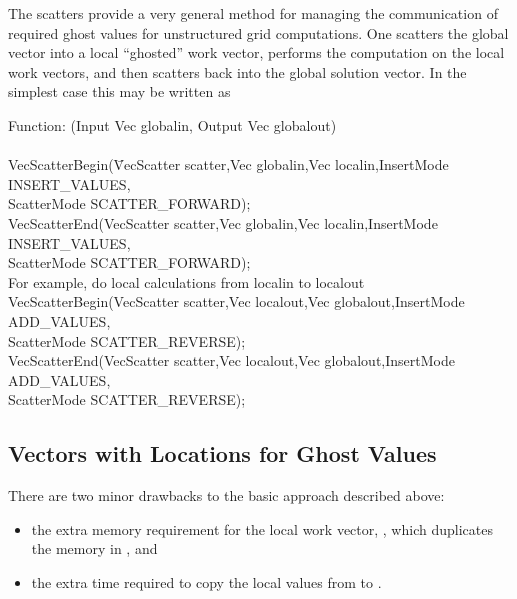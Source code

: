 The scatters provide a very general method for managing the communication of
required ghost values for unstructured grid computations. One scatters
the global vector into a local ``ghosted'' work vector, performs the computation
on the local work vectors, and then scatters back into the global solution
vector. In the simplest case this may be written as
\begin{tabbing}
   Function: (Input Vec globalin, Output Vec globalout)\\
\\
  VecScatterBegin(\=VecScatter scatter,Vec globalin,Vec localin,InsertMode INSERT\_VALUES,\\
                 \>         ScatterMode SCATTER\_FORWARD);\\
  VecScatterEnd(VecScatter scatter,Vec globalin,Vec localin,InsertMode INSERT\_VALUES,\\
                 \>       ScatterMode SCATTER\_FORWARD);\\
  \trl{/*} For example, do local calculations from localin to localout \trl{*/} \\
  VecScatterBegin(VecScatter scatter,Vec localout,Vec globalout,InsertMode ADD\_VALUES,\\
                 \>         ScatterMode SCATTER\_REVERSE);\\
  VecScatterEnd(VecScatter scatter,Vec localout,Vec globalout,InsertMode ADD\_VALUES,\\
                 \>       ScatterMode SCATTER\_REVERSE);
\end{tabbing}

\subsection{Vectors with Locations for Ghost Values}


There are two minor drawbacks to the basic approach described above:
\begin{itemize}
\item the extra memory requirement for the local work vector, , which
      duplicates the memory in , and
\item the extra time required to copy the local values from  to
      .
\end{itemize}

